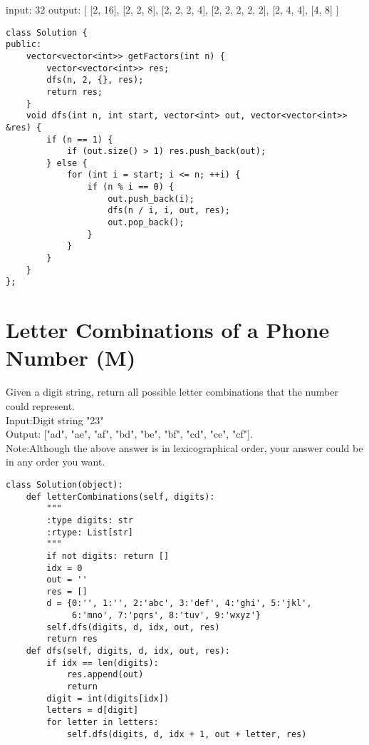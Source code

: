input: 32
output:
[
  [2, 16],
  [2, 2, 8],
  [2, 2, 2, 4],
  [2, 2, 2, 2, 2],
  [2, 4, 4],
  [4, 8]
]\\

\begin{lstlisting}
class Solution {
public:
    vector<vector<int>> getFactors(int n) {
        vector<vector<int>> res;
        dfs(n, 2, {}, res);
        return res;
    }
    void dfs(int n, int start, vector<int> out, vector<vector<int>> &res) {
        if (n == 1) {
            if (out.size() > 1) res.push_back(out);
        } else {
            for (int i = start; i <= n; ++i) {
                if (n % i == 0) {
                    out.push_back(i);
                    dfs(n / i, i, out, res);
                    out.pop_back();
                }
            }
        }
    }
};
\end{lstlisting}


\section{Letter Combinations of a Phone Number (M)}
Given a digit string, return all possible letter combinations that the number could represent.\\

Input:Digit string "23"\\
Output: ["ad", "ae", "af", "bd", "be", "bf", "cd", "ce", "cf"].\\

Note:Although the above answer is in lexicographical order, your answer could be in any order you want. \\

\begin{lstlisting}
class Solution(object):            
    def letterCombinations(self, digits):
        """
        :type digits: str
        :rtype: List[str]
        """
        if not digits: return []
        idx = 0
        out = ''
        res = []
        d = {0:'', 1:'', 2:'abc', 3:'def', 4:'ghi', 5:'jkl',
             6:'mno', 7:'pqrs', 8:'tuv', 9:'wxyz'}
        self.dfs(digits, d, idx, out, res)
        return res
    def dfs(self, digits, d, idx, out, res):
        if idx == len(digits):
            res.append(out)
            return
        digit = int(digits[idx])
        letters = d[digit]
        for letter in letters:
            self.dfs(digits, d, idx + 1, out + letter, res)
\end{lstlisting}

